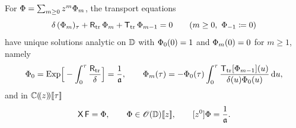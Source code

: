 \begin{prop}
\label{prop:row-transport}
For $\Phi=\sum_{m\geq0}z^m\Phi_m$, the transport equations
\[
\delta\,(\Phia_m)_\tau+\Rtr\,\Phia_m+\Ttr\,\Phia_{m-1}=0\qquad(m\geq0,\ \Phia_{-1}\coloneqq0)
\]
have unique solutions analytic on $\mathbb{D}$ with $\Phi_0(0)=1$ and $\Phi_m(0)=0$ for $m\geq1$, namely
\[
\Phi_0=\mathrm{Exp}\Big[-\int_0^\tau\frac{\mathsf{R}_{\mathrm{tr}}}{\delta}\Big]=\frac1{\mathfrak{a}},\qquad
\Phi_m(\tau)=-\Phi_0(\tau)\int_0^\tau\frac{\mathsf{T}_{\mathrm{tr}}[\Phi_{m-1}](u)}{\delta(u)\Phi_0(u)}\,\mathrm{d} u,
\]
and in $\mathbb{C}(\!(z)\!)[\![ \tau ]\!]$
\begin{equation}
\label{eq:row-transport}
\mathsf{X}\,\mathsf{F}=\Phi,\qquad \Phi\in\mathscr{O}(\mathbb{D})[\![ z ]\!],\qquad [z^0]\Phi=\frac1{\mathfrak{a}}.
\end{equation}
\end{prop}

